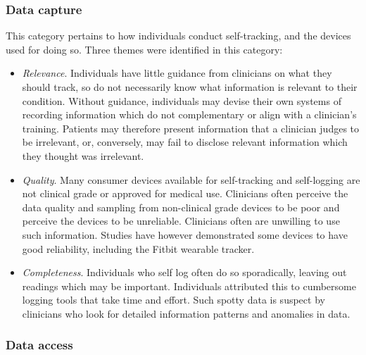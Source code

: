 \documentclass{sigchi}
\begin{document}
\subsubsection{Data capture}

This category pertains to how individuals conduct self-tracking, and the devices used for doing so. Three themes were identified in this category:

\begin{itemize}
    \item \textit{Relevance}. Individuals have little guidance from clinicians on what they should track, so do not necessarily know what information is relevant to their condition. Without guidance, individuals may devise their own systems of recording information which do  not complementary or align with a clinician's training. Patients may therefore present information that a clinician judges to be irrelevant, or, conversely, may fail to disclose relevant information which they thought was irrelevant. 
    
    \item \textit{Quality}. Many consumer devices available for self-tracking and self-logging are not clinical grade or approved for medical use. Clinicians often perceive the data quality and sampling from non-clinical grade devices to be poor and perceive the devices to be unreliable. Clinicians often are unwilling to use such information. Studies have however demonstrated some devices to have good reliability, including the Fitbit wearable tracker.
    
    \item \textit{Completeness}. Individuals who self log often do so sporadically, leaving out readings which may be important. Individuals attributed this to cumbersome logging tools that take time and effort. Such spotty data is suspect by clinicians who look for detailed information patterns and anomalies in data.
\end{itemize}

\subsubsection{Data access}
\end{document}
